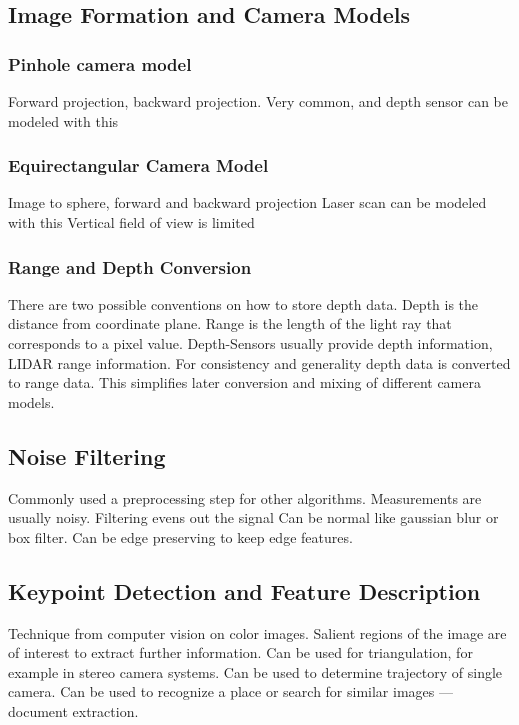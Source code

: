 \subsection{Image Formation and Camera Models}

\subsubsection{Pinhole camera model}

Forward projection, backward projection.
Very common, and depth sensor can be modeled with this

\subsubsection{Equirectangular Camera Model}

Image to sphere, forward and backward projection
Laser scan can be modeled with this
Vertical field of view is limited

\subsubsection{Range and Depth Conversion}

There are two possible conventions on how to store depth data.
Depth is the distance from coordinate plane.
Range is the length of the light ray that corresponds to a pixel value.
Depth-Sensors usually provide depth information, LIDAR range information.
For consistency and generality depth data is converted to range data.
This simplifies later conversion and mixing of different camera models.

\subsection{Noise Filtering}

Commonly used a preprocessing step for other algorithms.
Measurements are usually noisy. Filtering evens out the signal
Can be normal like gaussian blur or box filter.
Can be edge preserving to keep edge features.

\subsection{Keypoint Detection and Feature Description}

Technique from computer vision on color images.
Salient regions of the image are of interest to extract further information.
Can be used for triangulation, for example in stereo camera systems.
Can be used to determine trajectory of single camera.
Can be used to recognize a place or search for similar images --- document extraction.

